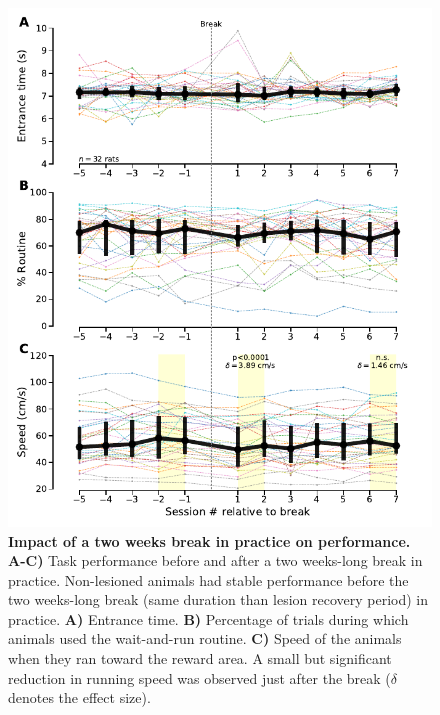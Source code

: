 \begin{figure}[h!]
	\begin{center}
		\includegraphics[scale=1]{ch-appendicies/figures/BreakEffect.pdf}
		\caption[Impact of a Two-week Break]
		{\textbf{Impact of a two weeks break in practice on performance.}
		\textbf{A-C)} Task performance before and after a two weeks-long break in practice.
		Non-lesioned animals had stable performance before the two weeks-long break (same duration than lesion recovery period) in practice.
		\textbf{A)} Entrance time.
		\textbf{B)} Percentage of trials during which animals used the wait-and-run routine.
		\textbf{C)} Speed of the animals when they ran toward the reward area.
		A small but significant reduction in running speed was observed just after the break ($\delta$ denotes the effect size).
		}
		\label{fig:appendix:break}
	\end{center}
\end{figure}